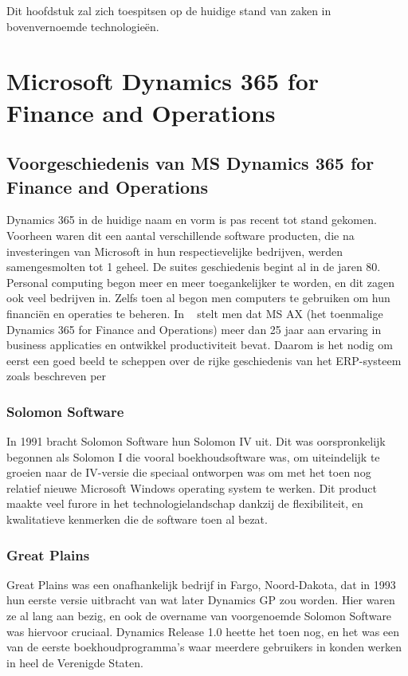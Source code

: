 Dit hoofdstuk zal zich toespitsen op de huidige stand van zaken in bovenvernoemde technologieën.  


\section{Microsoft Dynamics 365 for Finance and Operations}
\subsection{Voorgeschiedenis van MS Dynamics 365 for Finance and Operations}
Dynamics 365 in de huidige naam en vorm is pas recent tot stand gekomen. Voorheen waren dit een aantal verschillende software producten, die na investeringen van Microsoft in hun respectievelijke bedrijven, werden samengesmolten tot 1 geheel. De suites geschiedenis begint al in de jaren 80. Personal computing begon meer en meer toegankelijker te worden, en dit zagen ook veel bedrijven in. Zelfs toen al begon men  computers te gebruiken om hun financiën en operaties te beheren. In ~\cite{Olsen2009} stelt men dat MS AX (het toenmalige Dynamics 365 for Finance and Operations) meer dan 25 jaar aan ervaring in business applicaties en ontwikkel productiviteit bevat. Daarom is het nodig om eerst een goed beeld te scheppen over de rijke geschiedenis van het ERP-systeem zoals beschreven per ~\cite{Wright2018}

\subsubsection{Solomon Software }
In 1991 bracht Solomon Software hun Solomon IV uit. Dit was oorspronkelijk begonnen als Solomon I die vooral boekhoudsoftware was, om uiteindelijk te groeien naar de IV-versie die speciaal ontworpen was om met het toen nog relatief nieuwe Microsoft Windows operating system te werken. Dit product maakte veel furore in het technologielandschap dankzij de flexibiliteit, en kwalitatieve kenmerken die de software toen al bezat. 


\subsubsection{Great Plains }
Great Plains was een onafhankelijk bedrijf in Fargo, Noord-Dakota, dat in 1993 hun eerste versie uitbracht van wat later Dynamics GP zou worden. Hier waren ze al lang aan bezig, en ook de overname van voorgenoemde Solomon Software was hiervoor cruciaal. Dynamics Release 1.0 heette het toen nog, en het was een van de eerste boekhoudprogramma’s waar meerdere gebruikers in konden werken in heel de Verenigde Staten. 

